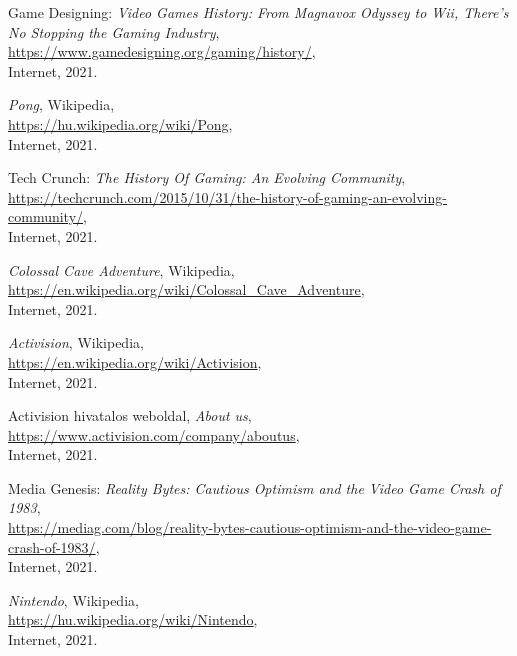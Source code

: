 \begin{thebibliography}{x}
	Game Designing: \emph{Video Games History: From Magnavox Odyssey to Wii, There’s No Stopping the Gaming Industry}, \\
	\url{https://www.gamedesigning.org/gaming/history/}, \\
	Internet, 2021.
	
	\emph{Pong}, Wikipedia, \\
	\url{https://hu.wikipedia.org/wiki/Pong}, \\
	Internet, 2021.
	
	Tech Crunch: \emph{The History Of Gaming: An Evolving Community}, \\
	\url{https://techcrunch.com/2015/10/31/the-history-of-gaming-an-evolving-community/}, \\
	Internet, 2021.
	
	\emph{Colossal Cave Adventure}, Wikipedia, \\
	\url{https://en.wikipedia.org/wiki/Colossal_Cave_Adventure}, \\
	Internet, 2021.
	
	\emph{Activision}, Wikipedia, \\
	\url{https://en.wikipedia.org/wiki/Activision}, \\
	Internet, 2021.
	
	Activision hivatalos weboldal, \emph{About us}, \\
	\url{https://www.activision.com/company/aboutus}, \\
	Internet, 2021.
	
	Media Genesis: \emph{Reality Bytes: Cautious Optimism and the Video Game Crash of 1983}, \\
	\url{https://mediag.com/blog/reality-bytes-cautious-optimism-and-the-video-game-crash-of-1983/}, \\
	Internet, 2021.
	
	\emph{Nintendo}, Wikipedia, \\
	\url{https://hu.wikipedia.org/wiki/Nintendo}, \\
	Internet, 2021.
	

\end{thebibliography}
